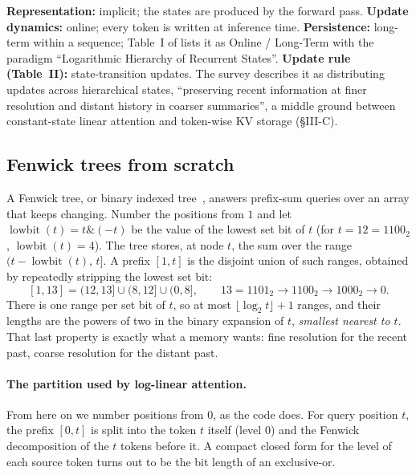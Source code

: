 \begin{taxonomy}
\textbf{Representation:} implicit; the states are produced by the forward pass.
\textbf{Update dynamics:} online; every token is written at inference time.
\textbf{Persistence:} long-term within a sequence; Table~I of \citet{zhoubian2026memory} lists it
as Online / Long-Term with the paradigm ``Logarithmic Hierarchy of Recurrent States''.
\textbf{Update rule (Table~II):} state-transition updates. The survey describes it as
distributing updates across hierarchical states, ``preserving recent information at finer
resolution and distant history in coarser summaries'', a middle ground between
constant-state linear attention and token-wise KV storage (\S III-C).
\end{taxonomy}

\subsection{Fenwick trees from scratch}\label{sec:c07-fenwick}

A Fenwick tree, or binary indexed tree~\citep{c07-fenwick1994}, answers prefix-sum queries
over an array that keeps changing. Number the positions from $1$ and let
$\operatorname{lowbit}(t) = t \mathbin{\&} (-t)$ be the value of the lowest set bit of $t$
(for $t = 12 = 1100_2$, $\operatorname{lowbit}(t) = 4$). The tree stores, at node $t$, the sum
over the range $(t - \operatorname{lowbit}(t),\, t]$. A prefix $[1, t]$ is the disjoint union
of such ranges, obtained by repeatedly stripping the lowest set bit:
\[
  [1, 13] = (12, 13] \cup (8, 12] \cup (0, 8], \qquad 13 = 1101_2 \to 1100_2 \to 1000_2 \to 0 .
\]
There is one range per set bit of $t$, so at most $\lfloor \log_2 t\rfloor + 1$ ranges, and
their lengths are the powers of two in the binary expansion of $t$, \emph{smallest nearest to
$t$}. That last property is exactly what a memory wants: fine resolution for the recent past,
coarse resolution for the distant past.

\paragraph{The partition used by log-linear attention.}
From here on we number positions from $0$, as the code does. For query position $t$, the
prefix $[0, t]$ is split into the token $t$ itself (level $0$) and the Fenwick decomposition
of the $t$ tokens before it. A compact closed form for the level of each source token turns
out to be the bit length of an exclusive-or.

